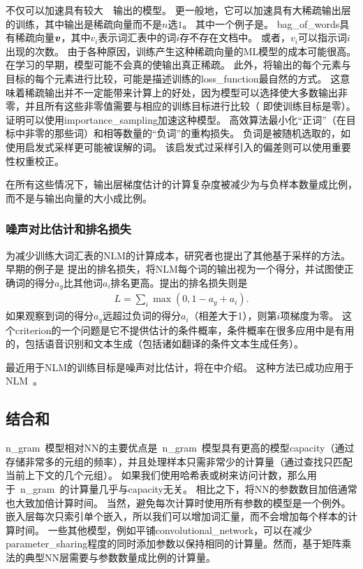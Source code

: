 不仅可以加速具有较大~~输出的模型。
更一般地，它可以加速具有大稀疏输出层的训练，其中输出是稀疏向量而不是$n$选$1$。
其中一个例子是。
\gls{bag_of_words}具有稀疏向量$\boldsymbol{\mathit{v}}$，其中$v_i$表示词汇表中的词$i$存不存在文档中。
或者，$v_i$可以指示词$i$出现的次数。
由于各种原因，训练产生这种稀疏向量的\gls{ML}模型的成本可能很高。
在学习的早期，模型可能不会真的使输出真正稀疏。
此外，将输出的每个元素与目标的每个元素进行比较，可能是描述训练的\gls{loss_function}最自然的方式。
这意味着稀疏输出并不一定能带来计算上的好处，因为模型可以选择使大多数输出非零，并且所有这些非零值需要与相应的训练目标进行比较（ 即使训练目标是零）。
\citet{Dauphin2011-small} 证明可以使用\gls{importance_sampling}加速这种模型。
高效算法最小化``正词''（在目标中非零的那些词）和相等数量的``负词''的重构损失。
负词是被随机选取的，如使用启发式采样更可能被误解的词。
该启发式过采样引入的偏差则可以使用重要性权重校正。


在所有这些情况下，输出层梯度估计的计算复杂度被减少为与负样本数量成比例，而不是与输出向量的大小成比例。


\subsubsection{噪声对比估计和排名损失}


\label{sec:combining_neural_language_models_with_n_grams}
为减少训练大词汇表的\gls{NLM}的计算成本，研究者也提出了其他基于采样的方法。
早期的例子是 \citet{Collobert+Weston-ICML2008}提出的排名损失，将\gls{NLM}每个词的输出视为一个得分，并试图使正确词的得分$a_y$比其他词$a_i$排名更高。提出的排名损失则是
\begin{align} 
 L = \sum_i \max(0,1-a_y+a_i).
\end{align} 
如果观察到词的得分$a_y$远超过负词的得分$a_i$（相差大于1），则第$i$项梯度为零。
这个\gls{criterion}的一个问题是它不提供估计的条件概率，条件概率在很多应用中是有用的，包括语音识别和文本生成（包括诸如翻译的条件文本生成任务）。

最近用于\gls{NLM}的训练目标是噪声对比估计，将在中介绍。
这种方法已成功应用于\gls{NLM}~\citep{Mnih+Teh-ICML2012,Mnih2013}。


\subsection{结合和}
\gls{n_gram}~模型相对\gls{NN}的主要优点是~\gls{n_gram}~模型具有更高的模型\gls{capacity}（通过存储非常多的元组的频率），并且处理样本只需非常少的计算量（通过查找只匹配当前上下文的几个元组）。
如果我们使用哈希表或树来访问计数，那么用于~\gls{n_gram}~的计算量几乎与\gls{capacity}无关。
相比之下，将\gls{NN}的参数数目加倍通常也大致加倍计算时间。
当然，避免每次计算时使用所有参数的模型是一个例外。
嵌入层每次只索引单个嵌入，所以我们可以增加词汇量，而不会增加每个样本的计算时间。
一些其他模型，例如平铺\gls{convolutional_network}，可以在减少\gls{parameter_sharing}程度的同时添加参数以保持相同的计算量。然而，基于矩阵乘法的典型\gls{NN}层需要与参数数量成比例的计算量。

